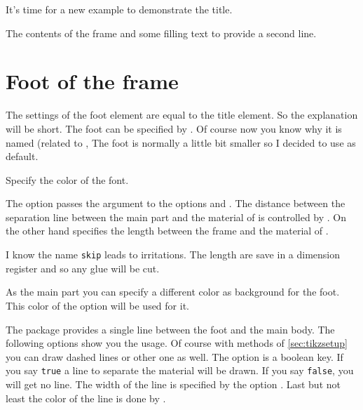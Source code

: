 \documentclass[openany,12pt,tocdepth=3]{ltx-md}
\begin{document}
It's time for a new example to demonstrate the title.

\begin{ltxexample}[caption={Example title part},label=title,result=true]
 \begin{xframed}[title-bg-color=brown!30,%
   line-width=2pt,line-color=brown!60,
  first-title={This is the title of the frame},
   margin=1.5cm,bg-color=yellow!20, ]
   The contents of the frame and some filling text to 
  provide a second line.
 \end{xframed}
\end{ltxexample}



\section{Foot of the frame}\label{sec:element-lastfoot}
The settings of the foot element are equal to the title element. So 
the explanation will be short. 
The foot can be specified by . Of course now you
know why it is named  (related to ,
The foot is normally a little bit smaller so I decided to use  as
default.


Specify the color of the font.

The option  passes the argument to the options 
and . The distance between the separation line between the 
main part and the material of  is controlled by .
On the other hand  specifies
the length between the frame and the material of .

\begin{Note}
I know the name \texttt{skip} leads to irritations. The length are save in a
dimension register and so any glue will be cut.
\end{Note}

As the main part you can specify a different color as background for
the foot. This color of the option  will be used for it.


The package  provides a single line between the foot and the main body.
The following options show you the usage. Of course with methods of
\autoref{sec:tikzsetup} you can draw dashed lines or other one as well.
The option  is a boolean key. If you say \texttt{true} a line to separate
the material will be drawn. If you say \texttt{false}, you will get no line.
The width of the line is specified by the option .
Last but not least the color of the line is done by .
\end{document}
